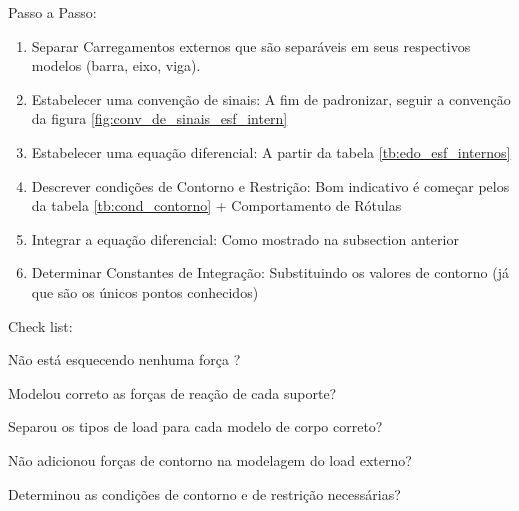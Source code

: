 \documentclass{article}
\begin{document}
        \begin{minipage}[t]{.7\textwidth}
            Passo a Passo:
            \begin{enumerate}\addtocounter{enumi}{-1}\tiny
                \item Separar Carregamentos externos que são separáveis em seus respectivos modelos (barra, eixo, viga).
                \item Estabelecer uma convenção de sinais: A fim de padronizar, seguir a convenção da figura \ref{fig:conv_de_sinais_esf_intern}
                \item Estabelecer uma equação diferencial: A partir da tabela \ref{tb:edo_esf_internos}
                \item Descrever condições de Contorno e Restrição: Bom indicativo é começar pelos da tabela \ref{tb:cond_contorno} + Comportamento de Rótulas
                \item Integrar a equação diferencial: Como mostrado na subsection anterior
                \item Determinar Constantes de Integração: Substituindo os valores de contorno (já que são os únicos pontos conhecidos)
            \end{enumerate}
        \end{minipage}\hfill
        \begin{minipage}[t]{.3\textwidth}
            Check list: 
            \begin{todolist}\tiny
                \item Não está esquecendo nenhuma força ?
                \item Modelou correto as forças de reação de cada suporte?
                \item Separou os tipos de load para cada modelo de corpo correto?
                \item Não adicionou forças de contorno na modelagem do load externo?
                \item Determinou as condições de contorno e de restrição necessárias?
            \end{todolist}
        \end{minipage}




    
\end{document}
